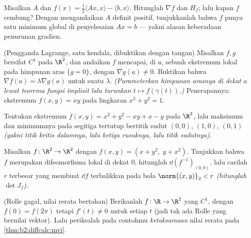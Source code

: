 \begin{exercise}[$\star\star$]\label{exo:b2:diffcalc:5}
Misalkan $A$  dan $f(x) = \frac12\langle Ax, x\rangle -
\langle b, x\rangle$. Hitunglah $\nabla f$ dan $H_f$; lalu kapan $f$
cembung? Dengan mengandaikan $A$ definit positif, tunjukkanlah bahwa $f$ punya satu
minimum global di penyelesaian $Ax = b$ --- yakni alasan keberadaan
penurunan gradien.
\end{exercise}

\begin{exercise}[$\star\star$]\label{exo:b2:diffcalc:6}
(Pengganda Lagrange, satu kendala, dibuktikan dengan tangan) Misalkan $f, g$
bersifat $C^1$ pada $\R^2$, dan andaikan $f$ mencapai, di $a$, sebuah ekstremum lokal
pada himpunan aras $\{g = 0\}$, dengan $\nabla g(a) \neq 0$. Buktikan bahwa
$\nabla f(a) = \lambda\nabla g(a)$ untuk suatu $\lambda$.
\emph{(Parameterkan himpunan arasnya di dekat $a$ lewat teorema fungsi
implisit lalu turunkan $t \mapsto f(\gamma(t))$.)} Penerapannya:
ekstremum $f(x,y) = xy$ pada lingkaran $x^2 + y^2 = 1$.
\end{exercise}

\begin{exercise}[$\star\star$]\label{exo:b2:diffcalc:7}
Tentukan ekstremum $f(x, y) = x^2 + y^2 - xy + x - y$ pada
$\R^2$, lalu maksimum dan minimumnya pada segitiga tertutup bertitik
sudut $(0,0)$, $(1,0)$, $(0,1)$ \emph{(yakni titik kritis dalamnya,
lalu ketiga rusuknya, lalu titik sudutnya)}.
\end{exercise}

\begin{exercise}[$\star\star\star$]\label{exo:b2:diffcalc:8}
Misalkan $f \colon \R^2 \to \R^2$ dengan $f(x, y) = (x + y^2,\; y + x^2)$.
Tunjukkan bahwa $f$ merupakan difeomorfisma lokal di dekat $0$, hitunglah
$\dd(f^{-1})_{(0,0)}$, lalu carilah $r$ terbesar yang membuat $\dd f$
terbalikkan pada bola $\norm{(x,y)}_2 < r$ \emph{(hitunglah
$\det J_f$)}.
\end{exercise}

\begin{exercise}[$\star\star\star$]\label{exo:b2:diffcalc:9}
(Rolle gagal, nilai rerata bertahan) Berikanlah $f \colon \R \to \R^2$
yang $C^1$, dengan $f(0) = f(2\pi)$ tetapi $f'(t) \neq 0$ untuk setiap $t$
(jadi tak ada Rolle yang bernilai vektor). Lalu periksalah pada contohmu
\emph{ketaksamaan} nilai rerata pada \cref{thm:b2:diffcalc:mvi}.
\end{exercise}

